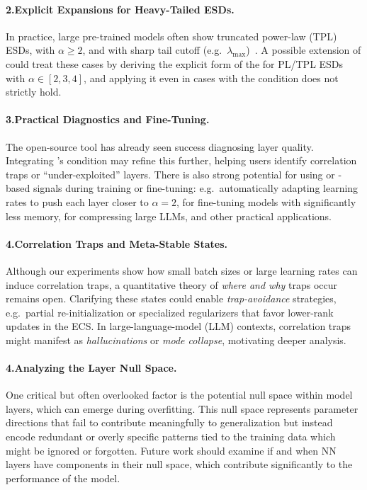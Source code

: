 \paragraph{2.\quad Explicit \RTransform Expansions for Heavy-Tailed  ESDs.}
In practice, large pre-trained models often show truncated power-law (TPL) ESDs, with $\alpha \ge 2$,
and with sharp tail cutoff  (e.g.\ $\lambda_{\max}$)~\cite{YTHx22_TR,YTHx23_KDD}.
A possible extension of \SETOL could treat these cases by deriving the explicit form
of the \RTransform for PL/TPL ESDs with $\alpha\in[2,3,4]$, and applying it even in
cases with the \TRACELOG condition does not strictly hold.

\paragraph{3.\quad Practical Diagnostics and Fine-Tuning.}
The open-source \WW tool has already seen success diagnosing layer quality. Integrating \SETOL’s 
\TRACELOG condition may refine this further, helping users identify correlation traps or “under-exploited” 
layers. There is also strong potential for using \ALPHA or \TRACELOG-based signals during training or 
fine-tuning: e.g.\ automatically adapting learning rates to push each layer closer to $\alpha=2$,
for fine-tuning models with significantly less memory\cite{XXX}, for compressing large LLMs\cite{XXX},
and other practical applications.

\paragraph{4.\quad Correlation Traps and Meta-Stable States.}
Although our experiments show how small batch sizes or large learning rates can induce correlation traps, 
a quantitative theory of \emph{where and why} traps occur remains open. Clarifying these states could 
enable \emph{trap-avoidance} strategies, e.g.\ partial re-initialization or specialized regularizers that 
favor lower-rank updates in the ECS. In large-language-model (LLM) contexts, correlation traps might 
manifest as \emph{hallucinations} or \emph{mode collapse}, motivating deeper analysis.

\paragraph{4.\quad Analyzing the Layer Null Space.}
One critical but often overlooked factor is the potential null space within model layers, which can emerge during overfitting. This null space represents parameter directions that fail to contribute meaningfully to generalization but instead encode redundant or overly specific patterns tied to the training data which might be ignored or forgotten.
Future work should examine if and when NN layers have components in their null space,
which contribute significantly to the performance of the model.

